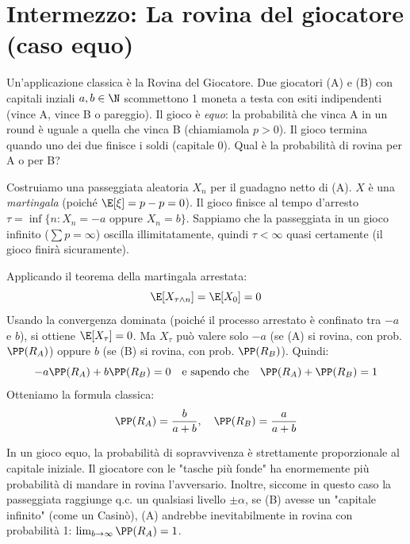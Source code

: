 \section{Intermezzo: La rovina del giocatore (caso equo)}

Un'applicazione classica è la Rovina del Giocatore. 
Due giocatori (A) e (B) con capitali inziali $a, b \in \N$ scommettono 1 moneta a testa con esiti indipendenti (vince A, vince B o pareggio). Il gioco è \emph{equo}: la probabilità che vinca A in un round è uguale a quella che vinca B (chiamiamola $p > 0$).
Il gioco termina quando uno dei due finisce i soldi (capitale 0). Qual è la probabilità di rovina per A o per B?

Costruiamo una passeggiata aleatoria $X_n$ per il guadagno netto di (A). $X$ è una \emph{martingala} (poiché $\E[\xi] = p - p = 0$). Il gioco finisce al tempo d'arresto $\tau = \inf\{n : X_n = -a \text{ oppure } X_n = b\}$.
Sappiamo che la passeggiata in un gioco infinito ($\sum p = \infty$) oscilla illimitatamente, quindi $\tau < \infty$ quasi certamente (il gioco finirà sicuramente).

Applicando il teorema della martingala arrestata:
\[ \E[X_{\tau \wedge n}] = \E[X_0] = 0 \]
Usando la convergenza dominata (poiché il processo arrestato è confinato tra $-a$ e $b$), si ottiene $\E[X_\tau] = 0$.
Ma $X_\tau$ può valere solo $-a$ (se (A) si rovina, con prob. $\PP(R_A)$) oppure $b$ (se (B) si rovina, con prob. $\PP(R_B)$).
Quindi:
\[ -a \PP(R_A) + b \PP(R_B) = 0 \quad \text{e sapendo che} \quad \PP(R_A) + \PP(R_B) = 1 \]
Otteniamo la formula classica:
\[ \PP(R_A) = \frac{b}{a+b}, \quad \PP(R_B) = \frac{a}{a+b} \]

\begin{hint}[Morale]
In un gioco equo, la probabilità di sopravvivenza è strettamente proporzionale al capitale iniziale. Il giocatore con le "tasche più fonde" ha enormemente più probabilità di mandare in rovina l'avversario.
Inoltre, siccome in questo caso la passeggiata raggiunge q.c. un qualsiasi livello $\pm \alpha$, se (B) avesse un "capitale infinito" (come un Casinò), (A) andrebbe inevitabilmente in rovina con probabilità 1: $\lim_{b \to \infty} \PP(R_A) = 1$.
\end{hint}
